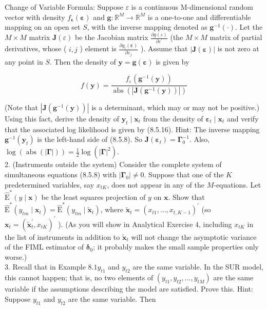 \documentclass[10pt]{article}
\begin{document}
Change of Variable Formula: Suppose $\varepsilon$ is a continuous M-dimensional random vector with density $f_{\boldsymbol{\epsilon}}(\boldsymbol{\varepsilon})$ and $\mathbf{g}: \mathbb{R}^{M} \rightarrow \mathbb{R}^{M}$ is a one-to-one and differentiable mapping on an open set $S$, with the inverse mapping denoted as $\mathbf{g}^{-1}(\cdot)$. Let the $M \times M$ matrix $\mathbf{J}(\varepsilon)$ be the Jacobian matrix $\frac{\partial g(\varepsilon)}{\partial \varepsilon^{\prime}}$ (the $M \times M$ matrix of partial derivatives, whose ( $i, j$ ) element is $\frac{\partial g_{i}(\boldsymbol{\varepsilon})}{\partial \varepsilon_{j}}$ ). Assume that $|\mathbf{J}(\boldsymbol{\varepsilon})|$ is not zero at any point in $S$. Then the density of $\mathbf{y}=\mathbf{g}(\boldsymbol{\varepsilon})$ is given by

$$
f(\mathbf{y})=\frac{f_{\varepsilon}\left(\mathbf{g}^{-1}(\mathbf{y})\right)}{\operatorname{abs}\left(\left|\mathbf{J}\left(\mathbf{g}^{-1}(\mathbf{y})\right)\right|\right)}
$$

(Note that $\left|\mathbf{J}\left(\mathbf{g}^{-1}(\mathbf{y})\right)\right|$ is a determinant, which may or may not be positive.) Using this fact, derive the density of $\mathbf{y}_{t} \mid \mathbf{x}_{t}$ from the density of $\boldsymbol{\varepsilon}_{t} \mid \mathbf{x}_{t}$ and verify that the associated log likelihood is given by (8.5.16). Hint: The inverse mapping $\mathbf{g}^{-1}\left(\mathbf{y}_{t}\right)$ is the left-hand side of (8.5.8). So $\mathbf{J}\left(\boldsymbol{\varepsilon}_{t}\right)=\boldsymbol{\Gamma}_{0}^{-1}$. Also, $\log (\operatorname{abs}(|\boldsymbol{\Gamma}|))=\frac{1}{2} \log \left(|\boldsymbol{\Gamma}|^{2}\right)$.\\
2. (Instruments outside the system) Consider the complete system of simultaneous equations (8.5.8) with $\left|\boldsymbol{\Gamma}_{0}\right| \neq 0$. Suppose that one of the $K$ predetermined variables, say $x_{t K}$, does not appear in any of the $M$-equations. Let $\widehat{\mathrm{E}}^{*}(y \mid \mathbf{x})$ be the least squares projection of $y$ on $\mathbf{x}$. Show that $\widehat{\mathrm{E}}^{*}\left(y_{t m} \mid \mathbf{x}_{t}\right)=\widehat{\mathrm{E}}^{*}\left(y_{t m} \mid \tilde{\mathbf{x}}_{t}\right)$, where $\tilde{\mathbf{x}}_{t}=\left(x_{t 1}, \ldots, x_{t, K-1}\right)^{\prime}$ (so $\mathbf{x}_{t}=\left(\tilde{\mathbf{x}}_{t}^{\prime}, x_{t K}\right)^{\prime}$ ). (As you will show in Analytical Exercise 4, including $x_{t K}$ in the list of instruments in addition to $\tilde{\mathbf{x}}_{t}$ will not change the asymptotic variance of the FIML estimator of $\boldsymbol{\delta}_{0}$; it probably makes the small sample properties only worse.)\\
3. Recall that in Example $8.1 y_{t 1}$ and $y_{t 2}$ are the same variable. In the SUR model, this cannot happen; that is, no two elements of $\left(y_{t 1}, y_{t 2}, \ldots, y_{t M}\right)$ are the same variable if the assumptions describing the model are satisfied. Prove this. Hint: Suppose $y_{t 1}$ and $y_{t 2}$ are the same variable. Then
\end{document}
